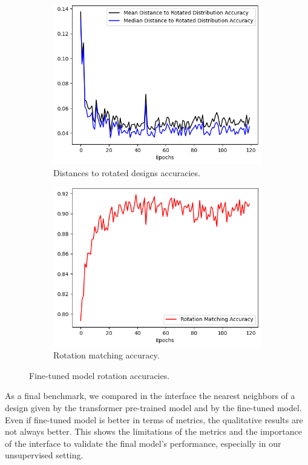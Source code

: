 \begin{figure}[]
    \begin{subfigure}[h]{0.5\linewidth}
        \includegraphics[width=\columnwidth]{images/rotation_metrics_evolution_openshape.png}
        \caption{Distances to rotated designs accuracies.}
    \end{subfigure}
    \hfill
    \begin{subfigure}[h]{0.5\linewidth}
        \includegraphics[width=\columnwidth]{images/rotation_accuracy_evolution_openshape.png}
        \caption{Rotation matching accuracy.}
    \end{subfigure}
    \caption{Fine-tuned model rotation accuracies.}
    \label{fig:rotation_metrics_evolution_openshape}
\end{figure}

As a final benchmark, we compared in the interface the nearest neighbors of a design given by the transformer pre-trained model and by the fine-tuned model. Even if fine-tuned model is better in terms of metrics, the qualitative results are not always better. This shows the limitations of the metrics and the importance of the interface to validate the final model's performance, especially in our unsupervised setting.
